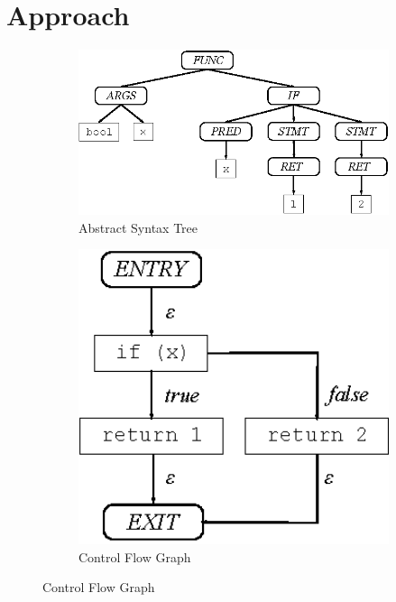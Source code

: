 \section{Approach}
\label{section:approach}



\begin{figure}[ht]
	\centering
	\begin{subfigure}[t]{0.33\textwidth}
		\centering
		\includegraphics[width=1\textwidth,height=0.65\textwidth,keepaspectratio]{./figure/ast.eps}
		\caption{Abstract Syntax Tree}
		\label{figure:ast}
	\end{subfigure}
	\begin{subfigure}[t]{0.33\textwidth}
		\centering
		\includegraphics[width=2\textwidth,height=0.65\textwidth,keepaspectratio]{./figure/cfg.eps}
		\caption{Control Flow Graph}
		\label{figure:cfg}
	\end{subfigure}

\end{figure}
